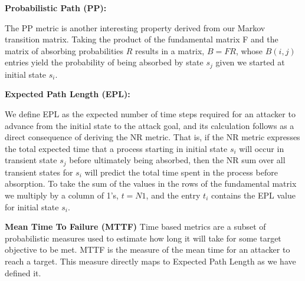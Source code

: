 \textbf{Probabilistic Path (PP):} 

The PP metric is another interesting property derived from our Markov transition matrix. Taking the product of the fundamental matrix F and the matrix of absorbing probabilities \(R\) results in a matrix, \(B = FR\), whose \(B(i,j) \) entries yield the probability of being absorbed by state \(s_j\) given we started at initial state \(s_i\).  

\textbf{Expected Path Length (EPL):  }

We define EPL as the expected number of time steps required for an attacker to advance from the initial state to the attack goal, and its calculation follows as a direct consequence of deriving the NR metric. That is, if the NR metric expresses the total expected time that a process starting in initial state $s_i$ will occur in transient state \(s_j\) before ultimately being absorbed, then the NR sum over all transient states for \(s_i\) will predict the total time spent in the process before absorption. To take the sum of the values in the rows of the fundamental matrix we multiply by a column of 1’s, $t = N1$, and the entry \(t_i\) contains the EPL value for initial state \(s_i\). 
 

\textbf{Mean Time To Failure (MTTF)} 
Time based metrics are a subset of probabilistic measures used to estimate how long it will take for some target objective to be met.
MTTF is the measure of the mean time for an attacker to reach a target. This measure directly maps to Expected Path Length as we have defined it. 
